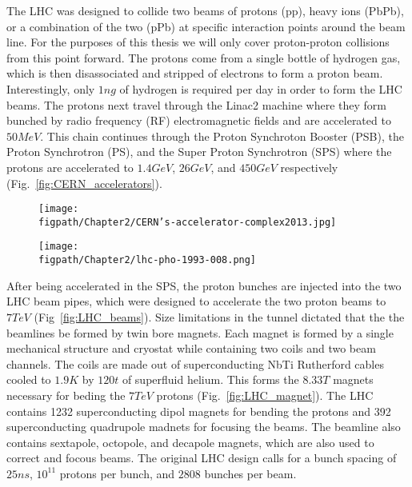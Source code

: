 The LHC was designed to collide two beams of protons (pp), heavy ions (PbPb), or a combination of the two (pPb) at specific interaction points around the beam line. For the purposes of this thesis we will only cover proton-proton collisions from this point forward. The protons come from a single bottle of hydrogen gas, which is then disassociated and stripped of electrons to form a proton beam. Interestingly, only $1\unit{ng}$ of hydrogen is required per day in order to form the LHC beams. The protons next travel through the Linac2 machine where they form bunched by radio frequency (RF) electromagnetic fields and are accelerated to $50\unit{MeV}$. This chain continues through the Proton Synchroton Booster (PSB), the Proton Synchrotron (PS), and the Super Proton Synchrotron (SPS) where the protons are accelerated to $1.4\unit{GeV}$, $26\unit{GeV}$, and $450\unit{GeV}$ respectively (Fig.~\ref{fig:CERN_accelerators}).

\begin{sidewaysfigure}[!hbt]
	\centering
	\begin{subfigure}[t]{0.4655\textwidth}
		\texttt{[image: \\figpath/Chapter2/CERN's-accelerator-complex2013.jpg]}
		\label{fig:CERN_accelerator_complex}
	\end{subfigure}
	\begin{subfigure}[t]{0.4655\textwidth}
		\texttt{[image: \\figpath/Chapter2/lhc-pho-1993-008.png]}
		\label{fig:LHC_LEP_injection_complex}
	\end{subfigure}
	\caption{Left: A schematic of the CERN accelerator complex~\cite{Marcastel:1621583}. Right: A diagram of the LHC injection chain. Also included is a diagram of the heavy ion and LEP injection chains~\cite{Jean-Luc:841568}.}
	\label{fig:CERN_accelerators}
\end{sidewaysfigure}

After being accelerated in the SPS, the proton bunches are injected into the two LHC beam pipes, which were designed to accelerate the two proton beams to $7\unit{TeV}$ (Fig~\ref{fig:LHC_beams}). Size limitations in the tunnel dictated that the the beamlines be formed by twin bore magnets. Each magnet is formed by a single mechanical structure and cryostat while containing two coils and two beam channels. The coils are made out of superconducting NbTi Rutherford cables cooled to $1.9\unit{K}$ by $120\unit{t}$ of superfluid helium. This forms the $8.33\unit{T}$ magnets necessary for beding the $7\unit{TeV}$ protons (Fig.~\ref{fig:LHC_magnet}). The LHC contains 1232 superconducting dipol magnets for bending the protons and 392 superconducting quadrupole madnets for focusing the beams. The beamline also contains sextapole, octopole, and decapole magnets, which are also used to correct and focous beams. The original LHC design calls for a bunch spacing of $25\unit{ns}$, $10^{11}$ protons per bunch, and $2808$ bunches per beam. %

